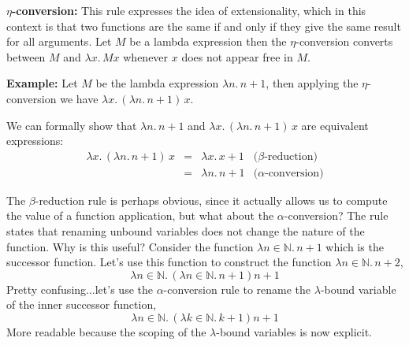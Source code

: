 \documentclass[a4paper,blends,pdf,colorBG,slideColor]{prosper}
\begin{document}

\small
{\bf $\eta$-conversion:}  This rule expresses the idea of extensionality, which in this context is that two functions are the same if and only if they give the same result for all arguments. Let $M$ be a lambda expression then the $\eta$-conversion converts between  $M$ and $\lambda x.\,M x$    whenever $x$ does not appear free in $M$.

\vspace{.1in}

{\bf Example:} Let $M$ be the lambda expression $\lambda n.\,n+1$, then applying the $\eta$-conversion we have $\lambda x.\,(\lambda n.\, n+1)\, x$.

\vspace{.1in}

We can formally show that $\lambda n.\,n+1$ and $\lambda x.\,(\lambda n.\, n+1)\, x$ are equivalent expressions:
\[
\begin{array}{rclr}
\lambda x.\,(\lambda n.\, n+1)\, x &=& \lambda x.\,x+1 & \mbox{($\beta$-reduction)}\\
	&=& \lambda n.\,n+1 &  \mbox{($\alpha$-conversion)}
\end{array}
\]

\es


{\scriptsize
The $\beta$-reduction rule is perhaps obvious, since it actually allows us to compute the value of
a function application, but what about the $\alpha$-conversion?
The rule states that renaming unbound variables does not change the nature of the function.  Why is this useful?  Consider the function $\lambda n \in {\mathbb{N}}.\, n + 1$ which is the successor function.  Let's use this function to construct the function $\lambda n \in {\mathbb{N}}.\, n +2$,
\[
\lambda n \in {\mathbb{N}}.\, (\lambda n \in {\mathbb{N}}.\, n + 1)n + 1
\]
Pretty confusing...let's use the $\alpha$-conversion rule to rename the $\lambda$-bound variable of the inner
successor function,
\[
\lambda n \in {\mathbb{N}}.\, (\lambda k \in {\mathbb{N}}.\, k + 1)n + 1
\]
More readable because the scoping of the $\lambda$-bound variables is now  explicit.
}
\es
\end{document}

